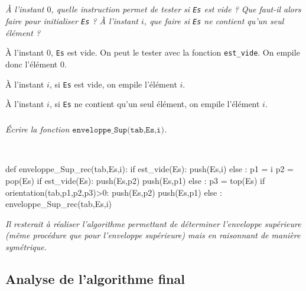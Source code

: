 \documentclass[10pt,fleqn]{article} %
\begin{document}
\subparagraph{}
\textit{À l'instant $0$, quelle instruction permet de tester si \texttt{Es} est vide ? Que faut-il alors faire pour initialiser \texttt{Es} ? À l'instant $i$, que faire si \texttt{Es} ne contient qu'un seul élément ?}
\ifprof
\begin{corrige}
À l'instant $0$, \texttt{Es} est vide. On peut le tester avec la fonction \texttt{est\_vide}. On empile donc l'élément $0$. 

À l'instant $i$, si \texttt{Es} est vide, on empile l'élément $i$. 

À l'instant $i$, si \texttt{Es} ne contient qu'un seul élément, on empile l'élément $i$. 


\end{corrige}
\else
\fi

\subparagraph{}
\textit{Écrire la fonction $\texttt{enveloppe\_Sup(tab,Es,i)}$.}
\ifprof
\begin{corrige}~\\

\begin{py}
\begin{python}
def enveloppe_Sup_rec(tab,Es,i):
    if est_vide(Es):
        push(Es,i)
    else :
        p1 = i
        p2 = pop(Es)
        if est_vide(Es):
            push(Es,p2)
            push(Es,p1)
        else :
            p3 = top(Es)
            if orientation(tab,p1,p2,p3)>0:
                push(Es,p2)
                push(Es,p1)
            else :
                enveloppe_Sup_rec(tab,Es,i)
\end{python}
\end{py}
\end{corrige}             
\else
\fi

\ifprof
\else

\vspace{.5cm}
\textsl{Il resterait à réaliser l'algorithme permettant de déterminer l'enveloppe supérieure (même procédure que pour l'enveloppe supérieure) mais en raisonnant de manière symétrique.}
\fi

\subsection{Analyse de l'algorithme final}
\end{document}
